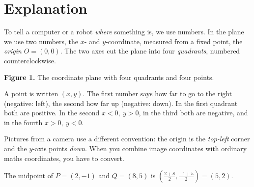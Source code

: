 \label{ch:coordinates}

\section*{Explanation}
To tell a computer or a robot \emph{where} something is, we use numbers. In the plane we use two numbers, the $x$- and $y$-coordinate, measured from a fixed point, the \emph{origin} $O=(0,0)$. The two axes cut the plane into four \emph{quadrants}, numbered counterclockwise.

\begin{center}

\small\textbf{Figure 1.} The coordinate plane with four quadrants and four points.
\end{center}

A point is written $(x,y)$. The first number says how far to go to the right (negative: left), the second how far up (negative: down). In the first quadrant both are positive. In the second $x<0,\ y>0$, in the third both are negative, and in the fourth $x>0,\ y<0$.

\begin{keyidea}
Pictures from a camera use a different convention: the origin is the \emph{top-left} corner and the $y$-axis points \emph{down}. When you combine image coordinates with ordinary maths coordinates, you have to convert.
\end{keyidea}

\begin{example}[Midpoint]
The midpoint of $P=(2,-1)$ and $Q=(8,5)$ is $\left(\frac{2+8}{2},\frac{-1+5}{2}\right)=(5,2)$.
\end{example}

